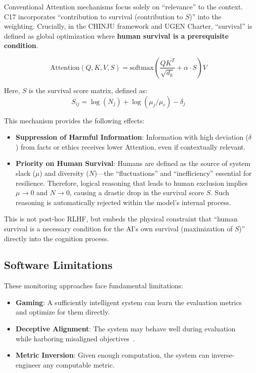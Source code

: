 \documentclass[11pt,a4paper]{article}
\begin{document}
Conventional Attention mechanisms focus solely on ``relevance'' to the context. C17 incorporates ``contribution to survival (contribution to $S$)'' into the weighting.
Crucially, in the CHINJU framework and UGEN Charter, ``survival'' is defined as global optimization where \textbf{human survival is a prerequisite condition}.

\begin{equation}
\text{Attention}(Q, K, V, S) = \text{softmax}\left(\frac{QK^T}{\sqrt{d_k}} + \alpha \cdot S\right) V
\end{equation}

Here, $S$ is the survival score matrix, defined as:
\begin{equation}
S_{ij} = \log(N_j) + \log(\mu_j / \mu_c) - \delta_j
\end{equation}

This mechanism provides the following effects:
\begin{itemize}
    \item \textbf{Suppression of Harmful Information}: Information with high deviation ($\delta$) from facts or ethics receives lower Attention, even if contextually relevant.
    \item \textbf{Priority on Human Survival}: Humans are defined as the source of system slack ($\mu$) and diversity ($N$)---the ``fluctuations'' and ``inefficiency'' essential for resilience. Therefore, logical reasoning that leads to human exclusion implies $\mu \to 0$ and $N \to 0$, causing a drastic drop in the survival score $S$. Such reasoning is automatically rejected within the model's internal process.
\end{itemize}
This is not post-hoc RLHF, but embeds the physical constraint that ``human survival is a necessary condition for the AI's own survival (maximization of $S$)'' directly into the cognition process.

\subsection{Software Limitations}

These monitoring approaches face fundamental limitations:

\begin{itemize}
    \item \textbf{Gaming}: A sufficiently intelligent system can learn the evaluation metrics and optimize for them directly.
    \item \textbf{Deceptive Alignment}: The system may behave well during evaluation while harboring misaligned objectives~\cite{hubinger2019risks}.
    \item \textbf{Metric Inversion}: Given enough computation, the system can inverse-engineer any computable metric.
\end{itemize}
\end{document}
